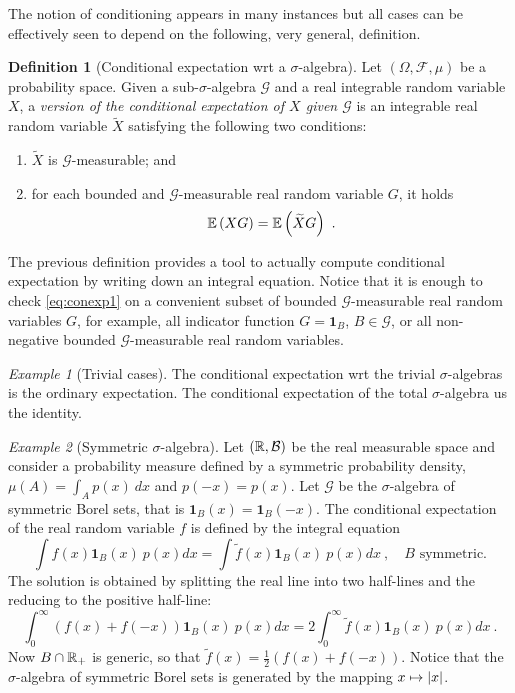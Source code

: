 \documentclass[12pt,a4paper]{amsart}
\newcommand{\one}{\bm 1}
\theoremstyle{plain}%
\theoremstyle{definition}
\newtheorem{definition}{Definition}%
\theoremstyle{remark}
\newtheorem{example}{Example}
\begin{document}
The notion of conditioning appears in many instances but all cases can
be effectively seen to depend on the following, very general,
definition.

\begin{definition}[Conditional expectation wrt a $\sigma$-algebra]\label{def:condexp1}
  Let $(\Omega,\mathcal F,\mu)$ be a probability space. Given a
  sub-$\sigma$-algebra $\mathcal G$ and a real integrable random
  variable $X$, a \emph{version of the conditional expectation of $X$
    given $\mathcal G$} is an integrable real random variable
  $\widetilde X$ satisfying the following two conditions:
\begin{enumerate}
\item $\widetilde X$ is $\mathcal G$-measurable; and
\item for each bounded and $\mathcal G$-measurable real random variable
  $G$, it holds
  \begin{equation}\label{eq:conexp1}
    \operatorname{\mathbb E}\left(XG\right) = \operatorname{\mathbb E}\left(\widetilde X G\right) \ .
  \end{equation}
\end{enumerate}
\end{definition}

The previous definition provides a tool to actually compute
conditional expectation by writing down an integral equation. Notice
that it is enough to check \cref{eq:conexp1} on a convenient subset of
bounded $\mathcal G$-measurable real random variables $G$, for
example, all indicator function $G=\one_B$, $B \in \mathcal G$, or all
non-negative bounded $\mathcal G$-measurable real random variables.

\begin{example}[Trivial cases] The conditional expectation wrt the
  trivial $\sigma$-algebras is the ordinary expectation. The
  conditional expectation of the total $\sigma$-algebra us the identity.
  
\end{example}
\begin{example}[Symmetric $\sigma$-algebra]
  Let $(\mathbb{R},\mathcal B)$ be the real measurable space and consider a
  probability measure defined by a symmetric probability density,
  $\mu(A) = \int_A p(x) \ dx$ and $p(-x) = p(x)$. Let $\mathcal G$ be the
  $\sigma$-algebra of symmetric Borel sets, that is $\one_B(x) =
  \one_B(-x)$. The conditional expectation of the real random variable
  $f$ is defined by the integral equation
  \begin{equation*}
    \int f(x)\one_B(x) \ p(x)dx = \int \tilde f(x) \one_B(x) \ p(x)dx
    \ , \quad \text{$B$ symmetric.} 
  \end{equation*}
The solution is obtained by splitting the real line into two
half-lines and the reducing to the positive half-line:
\begin{equation*}
  \int_0^\infty (f(x)+f(-x)) \one_B(x) \ p(x)dx = 2 \int_0^\infty
  \tilde f(x) \one_B(x) \ p(x)dx \ .
\end{equation*}
Now $B \cap \mathbb{R}_+$ is generic, so that $\tilde f(x) = \frac12 (f(x)
+ f(-x))$. Notice that the $\sigma$-algebra of symmetric Borel sets is
generated by the mapping $x \mapsto \left\vert x\right\vert$.
\end{example}
\end{document}
